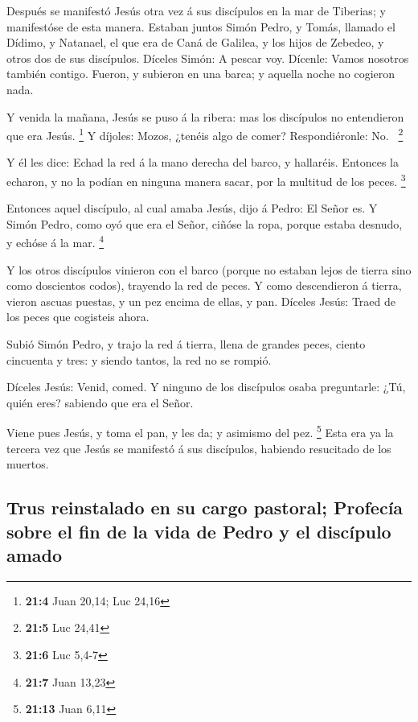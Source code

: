  Después se manifestó Jesús otra vez á sus discípulos en la
mar de Tiberias; y manifestóse de esta manera.  Estaban
juntos Simón Pedro, y Tomás, llamado el Dídimo, y Natanael, el que era
de Caná de Galilea, y los hijos de Zebedeo, y otros dos de sus
discípulos.  Díceles Simón: A pescar voy. Dícenle: Vamos
nosotros también contigo. Fueron, y subieron en una barca; y aquella
noche no cogieron nada.

 Y venida la mañana, Jesús se puso á la ribera: mas los
discípulos no entendieron que era Jesús. \footnote{\textbf{21:4} Juan
  20,14; Luc 24,16}  Y díjoles: Mozos, ¿tenéis algo de
comer? Respondiéronle: No.~ \footnote{\textbf{21:5} Luc 24,41}

 Y él les dice: Echad la red á la mano derecha del barco, y
hallaréis. Entonces la echaron, y no la podían en ninguna manera sacar,
por la multitud de los peces. \footnote{\textbf{21:6} Luc 5,4-7}

 Entonces aquel discípulo, al cual amaba Jesús, dijo á
Pedro: El Señor es. Y Simón Pedro, como oyó que era el Señor, ciñóse la
ropa, porque estaba desnudo, y echóse á la mar. \footnote{\textbf{21:7}
  Juan 13,23}

 Y los otros discípulos vinieron con el barco (porque no
estaban lejos de tierra sino como doscientos codos), trayendo la red de
peces.  Y como descendieron á tierra, vieron ascuas puestas,
y un pez encima de ellas, y pan.  Díceles Jesús: Traed de
los peces que cogisteis ahora.

 Subió Simón Pedro, y trajo la red á tierra, llena de
grandes peces, ciento cincuenta y tres: y siendo tantos, la red no se
rompió.

 Díceles Jesús: Venid, comed. Y ninguno de los discípulos
osaba preguntarle: ¿Tú, quién eres? sabiendo que era el Señor.

 Viene pues Jesús, y toma el pan, y les da; y asimismo del
pez. \footnote{\textbf{21:13} Juan 6,11}  Esta era ya la
tercera vez que Jesús se manifestó á sus discípulos, habiendo resucitado
de los muertos.

\hypertarget{trus-reinstalado-en-su-cargo-pastoral-profecuxeda-sobre-el-fin-de-la-vida-de-pedro-y-el-discuxedpulo-amado}{%
\subsection{Trus reinstalado en su cargo pastoral; Profecía sobre el fin
de la vida de Pedro y el discípulo
amado}\label{trus-reinstalado-en-su-cargo-pastoral-profecuxeda-sobre-el-fin-de-la-vida-de-pedro-y-el-discuxedpulo-amado}}


